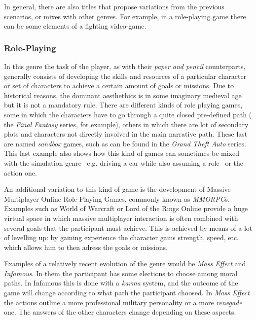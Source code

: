 \documentclass[
		twoside,openright,titlepage,numbers=noenddot,manychapters,
		headinclude,%
                footinclude=false,cleardoublepage=empty,
                BCOR=5mm,
		fontsize=11pt, %
                 enabledeprecatedfontcommands]{scrreprt}
\begin{document}
In general, there are also titles that propose variations from the previous scenarios, or mixes with other genres. For example, in a role-playing game there can be some elements of a fighting video-game.




\subsubsection{Role-Playing}



In this genre the task of the player, as with their \emph{paper and pencil} counterparts, generally consists of developing the skills and resources of a particular character or set of characters to achieve a certain amount of goals or missions. Due to historical reasons, the dominant aesthethics is in some imaginary medieval age but it is not a mandatory rule. 
 There are different kinds of role playing games, some in which the characters have to go through a quite closed pre-defined path ( the \emph{Final Fantasy} series, for example), others in which there are lot of secondary plots and characters not directly involved in the main narrative path. These last are named \emph{sandbox} games, such as can be found in the \emph{Grand Theft Auto} series. This last example also shows how this kind of games can sometimes be mixed with the simulation genre --e.g. driving a car while also assuming a role--  or the action one.

An additional variation to this kind of game is the development of Massive Multiplayer Online Role-Playing Games, commonly known as \emph{MMORPG}s. Examples such as World of Warcraft or Lord of the Rings Online provide a huge virtual space in which massive multiplayer interaction is often combined with several goals that the participant must achieve. This is achieved by means of a lot of levelling up: by gaining experience the character gains strength, speed, etc.  which allows him to then adress the goals or missions.

Examples of a relatively recent evolution of the genre would be \emph{Mass Effect} and \emph{Infamous}. In them the participant has some elections to choose among moral paths. In Infamous this is done with a \emph{karma} system, and the outcome of the game will change according to what path the participant choosed. In \emph{Mass Effect} the actions outline a more professional military personality or a more \emph{renegade} one. The answers of the other characters change depending on these aspects. 
\end{document}
